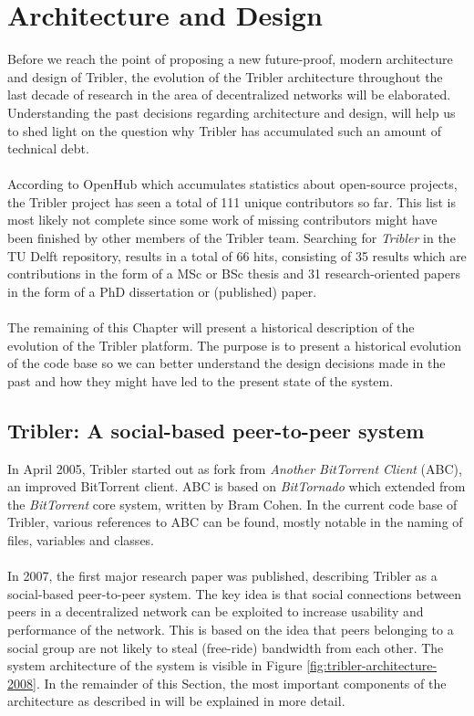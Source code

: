 \chapter{Architecture and Design}
\label{chapter:architecture}

Before we reach the point of proposing a new future-proof, modern architecture and design of Tribler, the evolution of the Tribler architecture throughout the last decade of research in the area of decentralized networks will be elaborated. Understanding the past decisions regarding architecture and design, will help us to shed light on the question why Tribler has accumulated such an amount of technical debt.\\\\
According to OpenHub which accumulates statistics about open-source projects, the Tribler project has seen a total of 111 unique contributors so far\cite{openhubtribler}. This list is most likely not complete since some work of missing contributors might have been finished by other members of the Tribler team. Searching for \emph{Tribler} in the TU Delft repository, results in a total of 66 hits, consisting of 35 results which are contributions in the form of a MSc or BSc thesis and 31 research-oriented papers in the form of a PhD dissertation or (published) paper.\\\\
The remaining of this Chapter will present a historical description of the evolution of the Tribler platform. The purpose is to present a historical evolution of the code base so we can better understand the design decisions made in the past and how they might have led to the present state of the system.

\section{Tribler: A social-based peer-to-peer system}
In April 2005, Tribler started out as fork from \emph{Another BitTorrent Client} (ABC), an improved BitTorrent client. ABC is based on \emph{BitTornado} which extended from the \emph{BitTorrent} core system, written by Bram Cohen. In the current code base of Tribler, various references to ABC can be found, mostly notable in the naming of files, variables and classes.\\\\
In 2007, the first major research paper was published, describing Tribler as a social-based peer-to-peer system\cite{pouwelse2008tribler}. The key idea is that social connections between peers in a decentralized network can be exploited to increase usability and performance of the network. This is based on the idea that peers belonging to a social group are not likely to steal (free-ride) bandwidth from each other. The system architecture of the system is visible in Figure \ref{fig:tribler-architecture-2008}. In the remainder of this Section, the most important components of the architecture as described in \cite{pouwelse2008tribler} will be explained in more detail.

